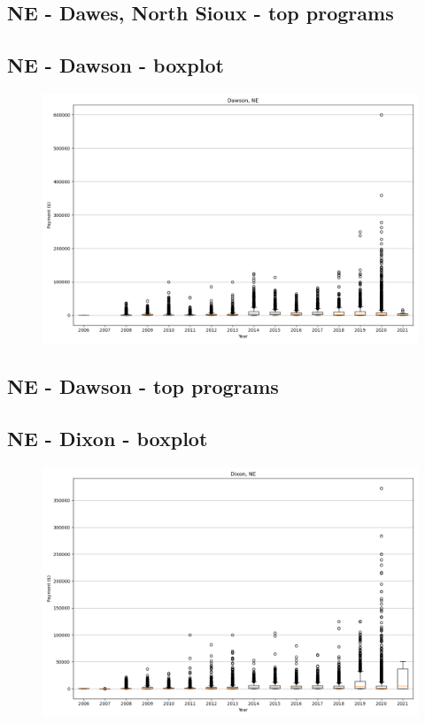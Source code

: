 \subsection*{NE - Dawes, North Sioux - top programs}

\newpage
\subsection*{NE - Dawson - boxplot}
\begin{figure}[h]
\centering
\includegraphics[width=7in]{../output/boxplots/counties/Dawson-NE_boxplot.png}
\end{figure}


\subsection*{NE - Dawson - top programs}

\newpage
\subsection*{NE - Dixon - boxplot}
\begin{figure}[h]
\centering
\includegraphics[width=7in]{../output/boxplots/counties/Dixon-NE_boxplot.png}
\end{figure}


